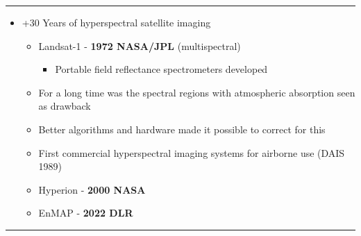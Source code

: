 \documentclass[12pt,preprintnumbers,amsmath,amssymb,nofootinbib,superscriptaddress]{revtex4-1}
\begin{document}
\vspace{1cm}
\vspace{\fill}



\newpage
{}
\vspace{-0.2cm}
\hrule
\vspace{0.8cm}

\begin{minipage}{0.6\textwidth}

  \begin{itemize}
    \item +30 Years of hyperspectral satellite imaging
    \begin{itemize}
      \item Landsat-1 - \textbf{1972 NASA/JPL} (multispectral)
      \begin{itemize}
        \item Portable field reflectance spectrometers developed
      \end{itemize}
      \item For a long time was the spectral regions with atmospheric absorption seen as drawback
      \item Better algorithms and hardware made it possible to correct for this
      \item First commercial hyperspectral imaging systems for airborne use (DAIS 1989)
      \item Hyperion - \textbf{2000 NASA} %
      \item EnMAP - \textbf{2022 DLR}
    \end{itemize}
  \end{itemize}




\end{minipage}

\begin{minipage}{0.39\textwidth}



\end{minipage}
\vspace{\fill}



\newpage
{}
\vspace{-0.2cm}
\hrule
\vspace{0.8cm}
\end{document}
